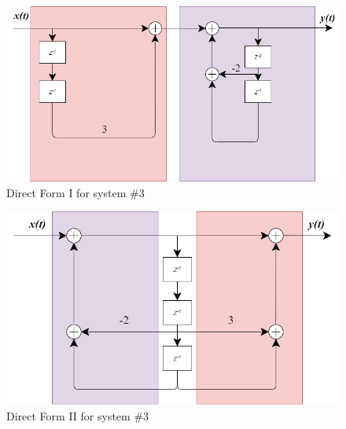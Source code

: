 \documentclass[12pt,letterpaper]{article}
\begin{document}
\begin{figure}[H]
    \centering
    \includegraphics[scale = 0.6]{figures/HW1Q5b2.png}
    \caption{Direct Form I for system \#3}
    \label{5a}
\end{figure}
\begin{figure}[H]
    \centering
    \includegraphics[scale = 0.6]{figures/HW1Q5b4.png}
    \caption{Direct Form II for system \#3}
    \label{5a}
\end{figure}
\pagebreak
\end{document}
